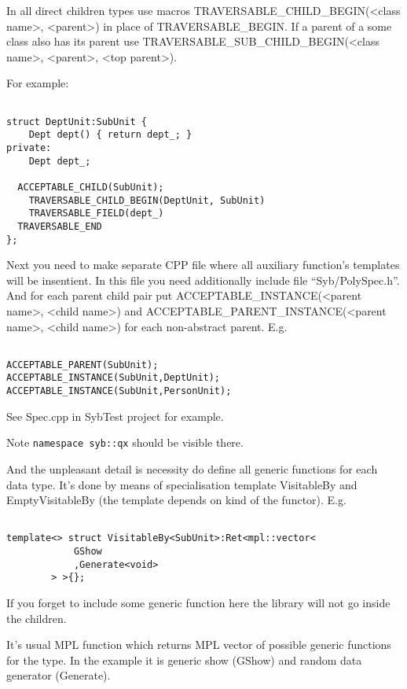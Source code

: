 \documentclass[a4paper]{article}
\begin{document}
In all direct children types use macros TRAVERSABLE\_CHILD\_BEGIN(<class name>, <parent>) in place of 
TRAVERSABLE\_BEGIN. If a parent of a some class also has its parent use 
TRAVERSABLE\_SUB\_CHILD\_BEGIN(<class name>, <parent>, <top parent>).


For example:

\begin{lstlisting}

struct DeptUnit:SubUnit {
	Dept dept() { return dept_; }
private:
	Dept dept_;

  ACCEPTABLE_CHILD(SubUnit);
	TRAVERSABLE_CHILD_BEGIN(DeptUnit, SubUnit)
    TRAVERSABLE_FIELD(dept_)
  TRAVERSABLE_END
};

\end{lstlisting}

Next you need to make separate CPP file where all auxiliary function's templates will be insentient. 
In this file you need additionally include file ``Syb/PolySpec.h''.
And for each parent child pair put ACCEPTABLE\_INSTANCE(<parent name>, <child name>)
and ACCEPTABLE\_PARENT\_INSTANCE(<parent name>, <child name>) for each non-abstract parent.
E.g.


\begin{lstlisting}

ACCEPTABLE_PARENT(SubUnit);
ACCEPTABLE_INSTANCE(SubUnit,DeptUnit);
ACCEPTABLE_INSTANCE(SubUnit,PersonUnit);

\end{lstlisting}


See Spec.cpp in SybTest project for example.

Note \lstinline{namespace syb::qx} should be visible there.

And the unpleasant detail is necessity do define all generic functions for each data type.
It's done by means of specialisation template VisitableBy and EmptyVisitableBy (the template 
depends on kind of the functor). 
E.g.

\begin{lstlisting}

template<> struct VisitableBy<SubUnit>:Ret<mpl::vector<
			GShow
			,Generate<void>
		> >{};

\end{lstlisting}

If you forget to include some generic function here the library will not go inside
the children.

It's usual MPL function which returns MPL vector of possible generic functions for the type.
In the example it is generic show (GShow) and random data generator (Generate).
\end{document}
